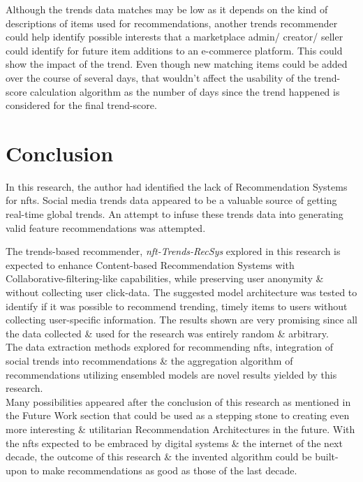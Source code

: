 \documentclass[manuscript,natbib=false]{acmart}
\begin{document}

Although the trends data matches may be low as it depends on the kind of descriptions of items used for recommendations, another trends recommender could help identify possible interests that a marketplace admin/ creator/ seller could identify for future item additions to an e-commerce platform. This could show the impact of the trend. Even though new matching items could be added over the course of several days, that wouldn't affect the usability of the trend-score calculation algorithm as the number of days since the trend happened is considered for the final trend-score.\\

\section{Conclusion}
In this research, the author had identified the lack of Recommendation Systems for \gls{nft}s. Social media trends data appeared to be a valuable source of getting real-time global trends. An attempt to infuse these trends data into generating valid feature recommendations was attempted.

The trends-based recommender, \textit{\gls{nft}-Trends-RecSys} explored in this research is expected to enhance Content-based Recommendation Systems with Collaborative-filtering-like capabilities, while preserving user anonymity \& without collecting user click-data. The suggested model architecture was tested to identify if it was possible to recommend trending, timely items to users without collecting user-specific information. The results shown are very promising since all the data collected \& used for the research was entirely random \& arbitrary.\\

The data extraction methods explored for recommending \gls{nft}s, integration of social trends into recommendations \& the aggregation algorithm of recommendations utilizing ensembled models are novel results yielded by this research.\\

Many possibilities appeared after the conclusion of this research as mentioned in the Future Work section that could be used as a stepping stone to creating even more interesting \& utilitarian Recommendation Architectures in the future. With the \gls{nft}s expected to be embraced by digital systems \& the internet of the next decade, the outcome of this research \& the invented algorithm could be built-upon to make recommendations as good as those of the last decade.
\end{document}
